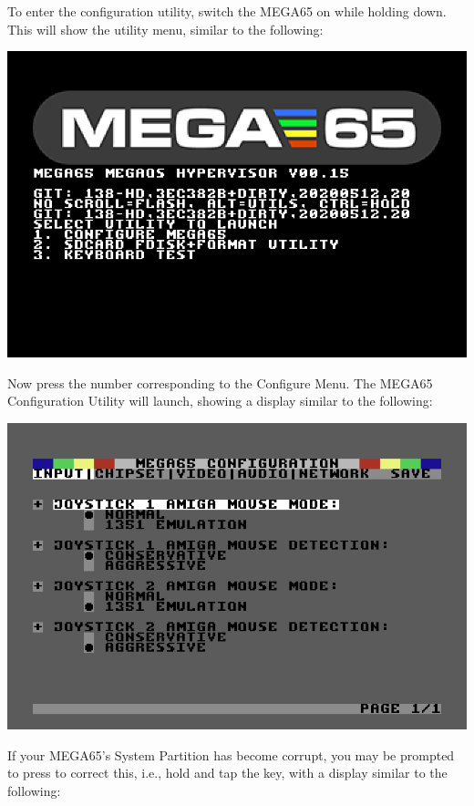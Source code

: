   To enter the configuration utility, switch the MEGA65 on while
  holding  down.  This will show the utility menu,
  similar to the following:

\begin{center}
  \includegraphics[width=0.7\linewidth]{images/ss-utilmenu.png}
\end{center}

  Now press the number corresponding to the Configure Menu.  The MEGA65
  Configuration Utility will launch, showing a display similar to
  the following:

\begin{center}
  \includegraphics[width=0.7\linewidth]{images/ss-m65config-1.png}
\end{center}

  If your MEGA65's System Partition has become corrupt, you may be
  prompted to press  to correct this, i.e., hold  and tap
  the  key, with a display similar to the following:

